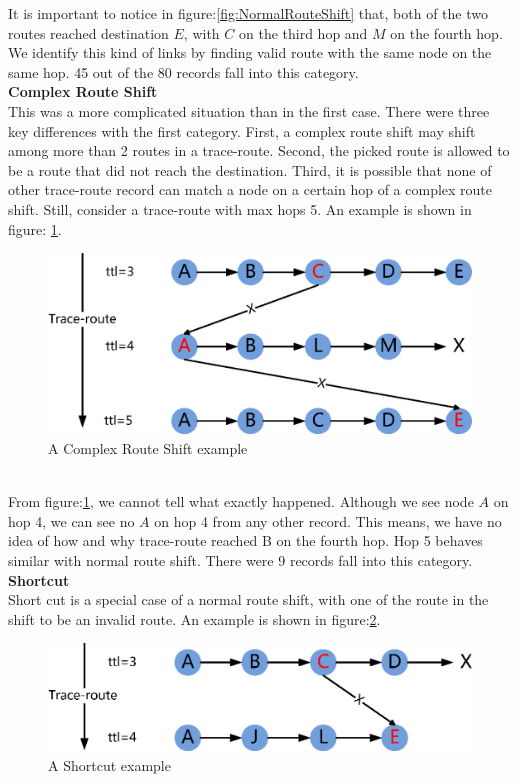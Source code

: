 \documentclass[conference, twocolumn, oneside, 10pt]{IEEEtran}
\begin{document}
It is important to notice in figure:\ref{fig:NormalRouteShift} that, both of the
two routes reached destination $E$, with $C$ on the third hop and $M$ on the fourth
hop. We identify this kind of links by finding valid route with the same node on
the same hop. 45 out of the 80 records fall into this category.\\
\textbf{Complex Route Shift}\\
This was a more complicated situation than in the first case. There were three
key differences with the first category. First, a complex route
shift may shift among more than 2 routes in a trace-route. Second, the picked route
is allowed to be a route that did not reach the destination.
Third, it is possible that none of other trace-route record can match a node on
a certain hop of a complex route shift. Still, consider a
trace-route with max hops 5. An example is shown in figure:
\ref{fig:ComplexRouteShift}.\\
\begin{figure}[h!]
  \centering
  \includegraphics[scale=0.5]{plot/ComplexRouteShift.eps}
  \caption{A Complex Route Shift example}
  \label{fig:ComplexRouteShift}
\end{figure}\\
From figure:\ref{fig:ComplexRouteShift}, we cannot tell what exactly happened.
Although we see node $A$ on hop 4, we can see no $A$ on hop 4 from any other
record. This means, we have no idea of how and why trace-route reached B on the
fourth hop. Hop 5 behaves similar with normal route shift. There were 9 records
fall into this category.\\
\textbf{Shortcut}\\
Short cut is a special case of a normal route shift, with one of the route in
the shift to be an invalid route. An example is shown in
figure:\ref{fig:Shortcut}.\\
\begin{figure}[h!]
  \centering
  \includegraphics[scale=0.5]{plot/Shortcut.eps}
  \caption{A Shortcut example}
  \label{fig:Shortcut}
\end{figure}\\
\end{document}
